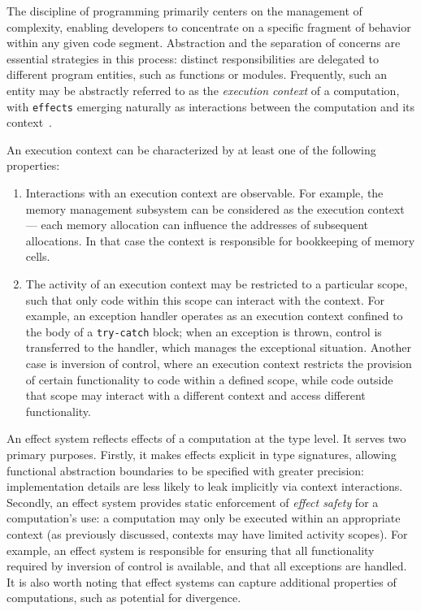 \documentclass[acmsmall,review,screen]{acmart}
\begin{document}


The discipline of programming primarily centers on the management of complexity, enabling developers to concentrate on a specific fragment of behavior within any given code segment.
Abstraction and the separation of concerns are essential strategies in this process: distinct responsibilities are delegated to different program entities, such as functions or modules.
Frequently, such an entity may be abstractly referred to as the \textit{execution context} of a computation, with \texttt{effects} emerging naturally as interactions between the computation and its context~\cite{kiselyov2013extensible}.

An execution context can be characterized by at least one of the following properties:
\begin{enumerate}
    \item Interactions with an execution context are observable.
    For example, the memory management subsystem can be considered as the execution context --- each memory allocation can influence the addresses of subsequent allocations.
    In that case the context is responsible for bookkeeping of memory cells.
    \item The activity of an execution context may be restricted to a particular scope, such that only code within this scope can interact with the context.
    For example, an exception handler operates as an execution context confined to the body of a \texttt{try-catch} block; when an exception is thrown, control is transferred to the handler, which manages the exceptional situation.
    Another case is inversion of control, where an execution context restricts the provision of certain functionality to code within a defined scope, while code outside that scope may interact with a different context and access different functionality.
\end{enumerate}

An effect system reflects effects of a computation at the type level.
It serves two primary purposes.
Firstly, it makes effects explicit in type signatures, allowing functional abstraction boundaries to be specified with greater precision: implementation details are less likely to leak implicitly via context interactions.
Secondly, an effect system provides static enforcement of \textit{effect safety} for a computation’s use: a computation may only be executed within an appropriate context (as previously discussed, contexts may have limited activity scopes).
For example, an effect system is responsible for ensuring that all functionality required by inversion of control is available, and that all exceptions are handled.
It is also worth noting that effect systems can capture additional properties of computations, such as potential for divergence.
\end{document}
